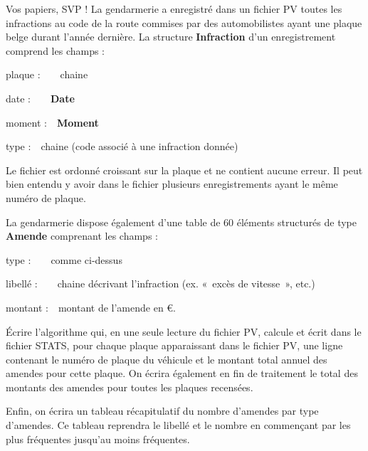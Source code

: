 \begin{Exercice}{Vos papiers, SVP !}
	La gendarmerie a enregistré dans un fichier PV toutes les infractions au
	code de la route commises par des automobilistes ayant une plaque belge
	durant l’année dernière. La structure \textbf{Infraction} d’un
	enregistrement comprend les champs :

	{	plaque :\ \ \ \ chaine}

	{	date :\ \ \ \ \textbf{Date}}

	{	moment :\ \ \textbf{Moment}}

	{	type :\ \ chaine (code associé à une infraction donnée)}

	Le fichier est ordonné croissant sur la plaque et ne contient aucune
	erreur. Il peut bien entendu y avoir dans le fichier plusieurs
	enregistrements ayant le même numéro de plaque.

	La gendarmerie dispose également d’une table 
	de 60 éléments structurés de type \textbf{Amende} comprenant les champs :

	{	type :\ \ \ \ comme ci-dessus}

	{	libellé :\ \ \ \ chaine décrivant l’infraction (ex. «~excès de vitesse~»,
	etc.)}

	{	montant :\ \ montant de l’amende en €.}

	Écrire l’algorithme qui, en une seule lecture du fichier PV, calcule et
	écrit dans le fichier STATS, pour chaque plaque apparaissant dans le
	fichier PV, une ligne contenant le numéro de plaque du véhicule et le
	montant total annuel des amendes pour cette plaque. On écrira également
	en fin de traitement le total des montants des amendes pour toutes les
	plaques recensées.

	Enfin, on écrira un tableau récapitulatif du nombre d’amendes par type
	d’amendes. Ce tableau reprendra le libellé et le nombre en commençant
	par les plus fréquentes jusqu’au moins fréquentes. 
\end{Exercice}

